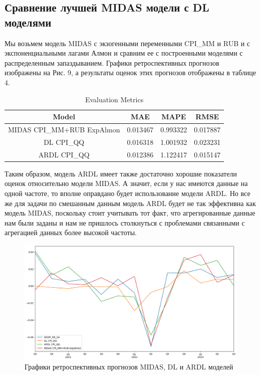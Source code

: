 \documentclass[a4paper, 12pt]{extarticle}
\numberwithin{equation}{subsection}
\begin{document}
	\subsection{Сравнение лучшей MIDAS модели с DL моделями}
	Мы возьмем модель MIDAS с экзогенными переменными CPI\_MM и RUB и с экспоненциальными лагами Алмон и сравним ее с построенными  моделями с распределенным запаздыванием. Графики ретроспективных прогнозов изображены на Рис. 9, а результаты оценок этих прогнозов отображены в таблице 4.
	
	\begin{table}[htbp]
		\centering
		\caption{Evaluation Metrics}
		\label{tab:evaluation_metrics}
		\begin{tabular}{|c|c|c|c|}
			\hline
			Model & MAE & MAPE & RMSE \\
			\hline
			MIDAS CPI\_MM+RUB ExpAlmon & 0.013467 & 0.993322 & 0.017887 \\
			DL CPI\_QQ                 & 0.016318 & 1.001932 & 0.023231 \\
			ARDL CPI\_QQ               & 0.012386 & 1.122417 & 0.015147 \\
			\hline
		\end{tabular}
	\end{table}
	
	Таким образом, модель ARDL имеет также достаточно хорошие показатели оценок относительно модели MIDAS. А значит, если у нас имеются данные на одной частоте, то вполне оправдано будет использование модели ARDL. Но все же для задачи по смешанным данным модель ARDL будет не так эффективна как модель MIDAS, поскольку стоит учитывать тот факт, что агрегированные данные нам были заданы и нам не пришлось столкнуться с проблемами связанными с агрегацией данных более высокой частоты.
	\newpage
	
	\begin{figure}[h]
		\centering
		\includegraphics[scale=0.5]{images/img09}
		\caption{Графики ретроспективных прогнозов MIDAS, DL и ARDL моделей}
		\label{fig:img09}
	\end{figure}
	 
\end{document}
